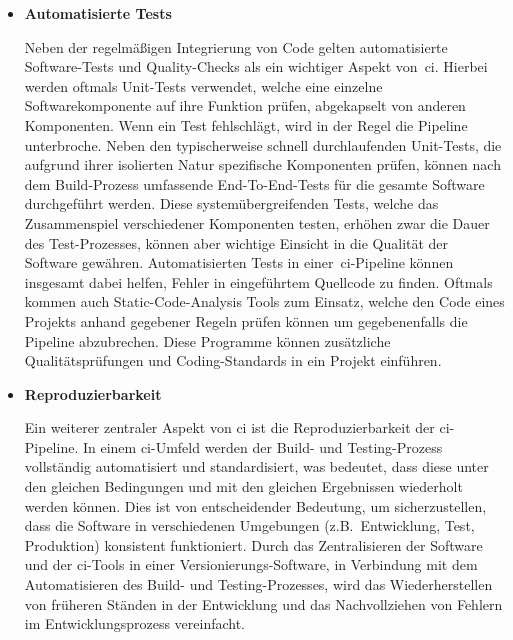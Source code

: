 \begin{itemize}
    \item {
        \textbf{Automatisierte Tests}\par
        Neben der regelmäßigen Integrierung von Code gelten automatisierte Software-Tests und Quality-Checks als ein
        wichtiger Aspekt von\ \acrshort{ci}.
        Hierbei werden oftmals Unit-Tests verwendet, welche eine einzelne Softwarekomponente auf
        ihre Funktion prüfen, abgekapselt von anderen Komponenten.
        Wenn ein Test fehlschlägt, wird in der Regel die Pipeline unterbroche.
        Neben den typischerweise schnell durchlaufenden Unit-Tests, die aufgrund ihrer isolierten Natur spezifische
        Komponenten prüfen, können nach dem Build-Prozess umfassende End-To-End-Tests für die gesamte Software
        durchgeführt werden.
        Diese systemübergreifenden Tests, welche das Zusammenspiel verschiedener Komponenten testen, erhöhen zwar die
        Dauer des Test-Prozesses, können aber wichtige Einsicht in die Qualität der Software gewähren.
        Automatisierten Tests in einer\ \acrshort{ci}-Pipeline können insgesamt dabei helfen, Fehler in eingeführtem
        Quellcode zu finden.
        Oftmals kommen auch Static-Code-Analysis Tools zum Einsatz, welche den Code eines Projekts anhand gegebener
        Regeln prüfen können um gegebenenfalls die Pipeline abzubrechen.
        Diese Programme können zusätzliche Qualitätsprüfungen und Coding-Standards in ein Projekt einführen.
    }

    \item {
        \textbf{Reproduzierbarkeit}\par
        Ein weiterer zentraler Aspekt von \acrlong{ci} ist die Reproduzierbarkeit der \acrshort{ci}-Pipeline.
        In einem \acrshort{ci}-Umfeld werden der Build- und Testing-Prozess vollständig automatisiert und
        standardisiert, was bedeutet, dass diese unter den gleichen Bedingungen und mit den gleichen Ergebnissen
        wiederholt werden können.
        Dies ist von entscheidender Bedeutung, um sicherzustellen, dass die Software in verschiedenen Umgebungen
        (z.B.\ Entwicklung, Test, Produktion) konsistent funktioniert.
        Durch das Zentralisieren der Software und der \acrshort{ci}-Tools in einer Versionierungs-Software, in
        Verbindung mit dem Automatisieren des Build- und Testing-Prozesses, wird das Wiederherstellen von früheren
        Ständen in der Entwicklung und das Nachvollziehen von Fehlern im Entwicklungsprozess vereinfacht.
    }


\end{itemize}
